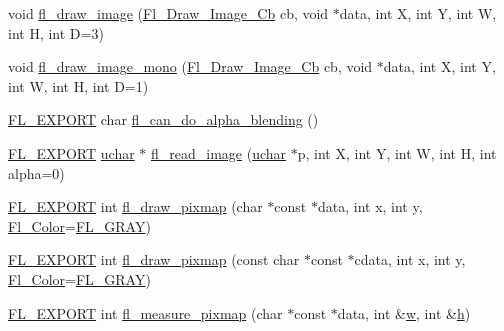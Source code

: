 \begin{DoxyCompactItemize}
\item 
void \hyperlink{group__fl__drawings_ga5b8f9bd2d3130529812dcc2c057eee35}{fl\+\_\+draw\+\_\+image} (\hyperlink{_fl___device_8_h_a702e2cb8dd542dda67e5c206b0d73a07}{Fl\+\_\+\+Draw\+\_\+\+Image\+\_\+\+Cb} cb, void $\ast$data, int X, int Y, int W, int H, int D=3)
\item 
void \hyperlink{group__fl__drawings_gab2a42aceaea722696f9b403473ec16a9}{fl\+\_\+draw\+\_\+image\+\_\+mono} (\hyperlink{_fl___device_8_h_a702e2cb8dd542dda67e5c206b0d73a07}{Fl\+\_\+\+Draw\+\_\+\+Image\+\_\+\+Cb} cb, void $\ast$data, int X, int Y, int W, int H, int D=1)
\item 
\hyperlink{_fl___export_8_h_aa9ba29a18aee9d738370a06eeb4470fc}{F\+L\+\_\+\+E\+X\+P\+O\+RT} char \hyperlink{group__fl__drawings_gabc04f934741e868e3d537761a955bfdb}{fl\+\_\+can\+\_\+do\+\_\+alpha\+\_\+blending} ()
\item 
\hyperlink{_fl___export_8_h_aa9ba29a18aee9d738370a06eeb4470fc}{F\+L\+\_\+\+E\+X\+P\+O\+RT} \hyperlink{fl__types_8h_a65f85814a8290f9797005d3b28e7e5fc}{uchar} $\ast$ \hyperlink{group__fl__drawings_ga0cdc05d3f7689e1c6b8a26fd0bd97233}{fl\+\_\+read\+\_\+image} (\hyperlink{fl__types_8h_a65f85814a8290f9797005d3b28e7e5fc}{uchar} $\ast$p, int X, int Y, int W, int H, int alpha=0)
\item 
\hyperlink{_fl___export_8_h_aa9ba29a18aee9d738370a06eeb4470fc}{F\+L\+\_\+\+E\+X\+P\+O\+RT} int \hyperlink{group__fl__drawings_gaebd9b6111b8a511eff62749f1b756a31}{fl\+\_\+draw\+\_\+pixmap} (char $\ast$const $\ast$data, int x, int y, \hyperlink{_enumerations_8_h_a8b762953646f8abee866061f1af78a6a}{Fl\+\_\+\+Color}=\hyperlink{_enumerations_8_h_aabb3b3628ea5baa2ba176201ed5d2aba}{F\+L\+\_\+\+G\+R\+AY})
\item 
\hyperlink{_fl___export_8_h_aa9ba29a18aee9d738370a06eeb4470fc}{F\+L\+\_\+\+E\+X\+P\+O\+RT} int \hyperlink{group__fl__drawings_gab830e417d8f17fcd00acdb96711b9119}{fl\+\_\+draw\+\_\+pixmap} (const char $\ast$const $\ast$cdata, int x, int y, \hyperlink{_enumerations_8_h_a8b762953646f8abee866061f1af78a6a}{Fl\+\_\+\+Color}=\hyperlink{_enumerations_8_h_aabb3b3628ea5baa2ba176201ed5d2aba}{F\+L\+\_\+\+G\+R\+AY})
\item 
\hyperlink{_fl___export_8_h_aa9ba29a18aee9d738370a06eeb4470fc}{F\+L\+\_\+\+E\+X\+P\+O\+RT} int \hyperlink{group__fl__drawings_ga1a254e8b7b3699d0d3b9c8e2fb2b5eb6}{fl\+\_\+measure\+\_\+pixmap} (char $\ast$const $\ast$data, int \&\hyperlink{forms_8_h_aac374e320caaadeca4874add33b62af2}{w}, int \&\hyperlink{forms_8_h_a7e427ba5b307f9068129699250690066}{h})

\end{DoxyCompactItemize}
